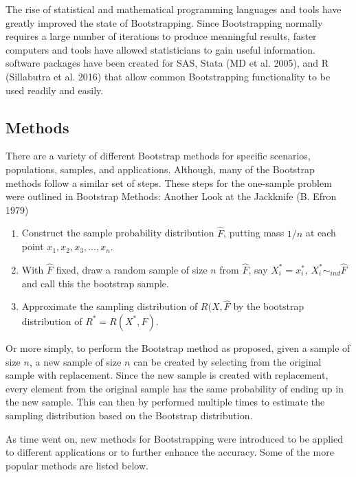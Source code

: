 \documentclass[
  letterpaper,
  DIV=11,
  numbers=noendperiod]{scrartcl}
\providecommand{\tightlist}{%
  \setlength{\itemsep}{0pt}\setlength{\parskip}{0pt}}\usepackage{longtable,booktabs,array}
\begin{document}
The rise of statistical and mathematical programming languages and tools
have greatly improved the state of Bootstrapping. Since Bootstrapping
normally requires a large number of iterations to produce meaningful
results, faster computers and tools have allowed statisticians to gain
useful information. software packages have been created for SAS, Stata
(MD et al. 2005), and R (Sillabutra et al. 2016) that allow common
Bootstrapping functionality to be used readily and easily.

\hypertarget{methods}{%
\subsection{Methods}\label{methods}}

There are a variety of different Bootstrap methods for specific
scenarios, populations, samples, and applications. Although, many of the
Bootstrap methods follow a similar set of steps. These steps for the
one-sample problem were outlined in Bootstrap Methods: Another Look at
the Jackknife (B. Efron 1979)

\begin{enumerate}
\def\labelenumi{\arabic{enumi}.}
\tightlist
\item
  Construct the sample probability distribution \(\hat{F}\), putting
  mass \(1/n\) at each point \(x_1, x_2, x_3, . . . , x_n\).
\item
  With \(\hat{F}\) fixed, draw a random sample of size \(n\) from
  \(\hat{F}\), say \(X_{i}^{*} = x_{i}^{*}\),
  \(X_{i}^{*} \sim _{ind}\hat{F}\) and call this the bootstrap sample.
\item
  Approximate the sampling distribution of \(R(X, \hat{F}\) by the
  bootstrap distribution of \(R^{*} = R(X^{*}, \hat{F})\).
\end{enumerate}

Or more simply, to perform the Bootstrap method as proposed, given a
sample of size \(n\), a new sample of size \(n\) can be created by
selecting from the original sample with replacement. Since the new
sample is created with replacement, every element from the original
sample has the same probability of ending up in the new sample. This can
then by performed multiple times to estimate the sampling distribution
based on the Bootstrap distribution.

As time went on, new methods for Bootstrapping were introduced to be
applied to different applications or to further enhance the accuracy.
Some of the more popular methods are listed below.
\end{document}
